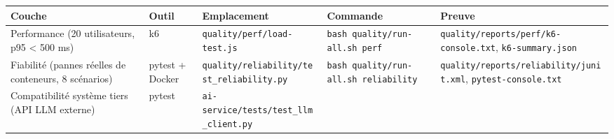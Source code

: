 \documentclass[
  11pt,
]{article}
\begin{document}
\begin{longtable}[]{@{}
  >{\raggedright\arraybackslash}p{}
  >{\raggedright\arraybackslash}p{}
  >{\raggedright\arraybackslash}p{}
  >{\raggedright\arraybackslash}p{}
  >{\raggedright\arraybackslash}p{}@{}}
\toprule\noalign{}
\begin{minipage}[b]{\linewidth}\raggedright
Couche
\end{minipage} & \begin{minipage}[b]{\linewidth}\raggedright
Outil
\end{minipage} & \begin{minipage}[b]{\linewidth}\raggedright
Emplacement
\end{minipage} & \begin{minipage}[b]{\linewidth}\raggedright
Commande
\end{minipage} & \begin{minipage}[b]{\linewidth}\raggedright
Preuve
\end{minipage} \\
\midrule\noalign{}
\endhead
\bottomrule\noalign{}
\endlastfoot
Performance (20 utilisateurs, p95 \textless{} 500 ms) & k6 &
\texttt{quality/}\allowbreak{}\texttt{perf/}\allowbreak{}\texttt{load-}\allowbreak{}\texttt{test.}\allowbreak{}\texttt{js}
&
\texttt{bash\ quality/}\allowbreak{}\texttt{run-}\allowbreak{}\texttt{all.}\allowbreak{}\texttt{sh\ perf}
&
\texttt{quality/}\allowbreak{}\texttt{reports/}\allowbreak{}\texttt{perf/}\allowbreak{}\texttt{k6-}\allowbreak{}\texttt{console.}\allowbreak{}\texttt{txt},
\texttt{k6-summary.json} \\
Fiabilité (pannes réelles de conteneurs, 8 scénarios) & pytest + Docker
&
\texttt{quality/}\allowbreak{}\texttt{reliability/}\allowbreak{}\texttt{test\_}\allowbreak{}\texttt{reliability.}\allowbreak{}\texttt{py}
&
\texttt{bash\ quality/}\allowbreak{}\texttt{run-}\allowbreak{}\texttt{all.}\allowbreak{}\texttt{sh\ reliability}
&
\texttt{quality/}\allowbreak{}\texttt{reports/}\allowbreak{}\texttt{reliability/}\allowbreak{}\texttt{junit.}\allowbreak{}\texttt{xml},
\texttt{pytest-console.txt} \\
Compatibilité système tiers (API LLM externe) & pytest &
\texttt{ai-}\allowbreak{}\texttt{service/}\allowbreak{}\texttt{tests/}\allowbreak{}\texttt{test\_}\allowbreak{}\texttt{llm\_}\allowbreak{}\texttt{client.}\allowbreak{}\texttt{py}

\end{longtable}
\end{document}
